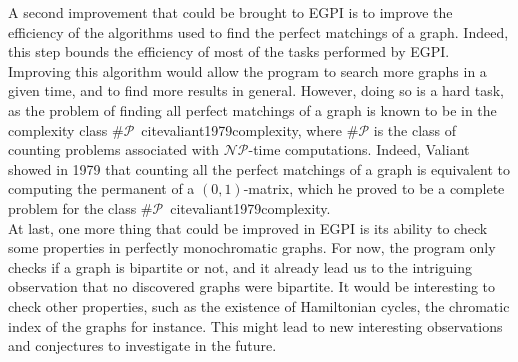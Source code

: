 A second improvement that could be brought to EGPI is to improve the efficiency of the algorithms used to find the perfect matchings of a graph.
Indeed, this step bounds the efficiency of most of the tasks performed by EGPI\@.
Improving this algorithm would allow the program to search more graphs in a given time, and to find more results in general.
However, doing so is a hard task, as the problem of finding all perfect matchings of a graph is known to be in the complexity class $\#\mathcal{P}$~cite{valiant1979complexity}, where $\#\mathcal{P}$ is the class of counting problems associated with $\mathcal{NP}$-time computations.
Indeed, Valiant showed in 1979 that counting all the perfect matchings of a graph is equivalent to computing the permanent of a $(0, 1)$-matrix, which he proved to be a complete problem for the class $\#\mathcal{P}$~cite{valiant1979complexity}.\\

At last, one more thing that could be improved in EGPI is its ability to check some properties in perfectly monochromatic graphs.
For now, the program only checks if a graph is bipartite or not, and it already lead us to the intriguing observation that no discovered graphs were bipartite.
It would be interesting to check other properties, such as the existence of Hamiltonian cycles, the chromatic index of the graphs for instance.
This might lead to new interesting observations and conjectures to investigate in the future.
